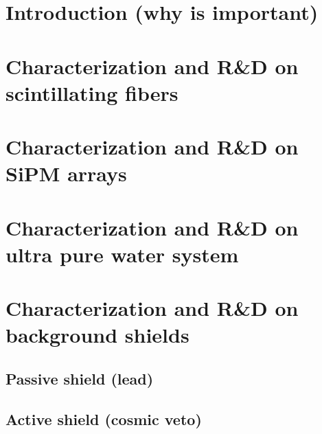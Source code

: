 \documentclass[12pt,a4paper]{book}
\begin{document}
	\section{Introduction (why is important)}
	 \label{sec:IntroCharacterisation}
	\newpage
	
	\section[Characetrization fibers]{Characterization and R\&D on scintillating fibers}
	\label{sec:CharacterizationScintillatingFibers}
	\newpage
		
	\section[Characterization SiPM arrays]{Characterization and R\&D on SiPM arrays}
	\label{sec:CharacterizationSiPM}
	\newpage
	
	\section[Characetrization water system]{Characterization and R\&D on ultra pure water system}
	\label{sec:CharacterizationUltraPureWaterSystem}
	\newpage
		
	\section[Characterization shields]{Characterization and R\&D on background shields}
	\label{sec:RyDBackground}
	
	\subsection{Passive shield (lead)}
	 \label{subsec:CharacterizationPassiveShield}
					
	\subsection{Active shield (cosmic veto)} %
	\label{subsec:CharacterizationActiveShield}
\end{document}
